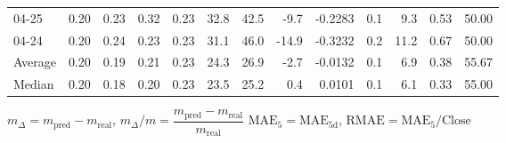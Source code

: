 \begin{threeparttable}
{\begin{tabular}{lrrrrrrrrrrrr}
  04-25 &          0.20 &          0.23 &          0.32 &        0.23 &                32.8 &                42.5 &       -9.7 &      -0.2283 &                 0.1 &              9.3 &            0.53 &                  50.00 \\
  04-24 &          0.20 &          0.24 &          0.23 &        0.23 &                31.1 &                46.0 &      -14.9 &      -0.3232 &                 0.2 &             11.2 &            0.67 &                  50.00 \\
Average &          0.20 &          0.19 &          0.21 &        0.23 &                24.3 &                26.9 &       -2.7 &      -0.0132 &                 0.1 &              6.9 &            0.38 &                  55.67 \\
 Median &          0.20 &          0.18 &          0.20 &        0.23 &                23.5 &                25.2 &        0.4 &       0.0101 &                 0.1 &              6.1 &            0.33 &                  55.00 \\
\bottomrule
\end{tabular}
}
\begin{tablenotes}\footnotesize
\item $m_\Delta=m_{\text{pred}}-m_{\text{real}}$,
$m_\Delta/m=\dfrac{m_{\text{pred}}-m_{\text{real}}}{m_{\text{real}}}$
$\mathrm{MAE}_5=\mathrm{MAE}_{5\text{d}}$,
$\mathrm{RMAE}=\mathrm{MAE}_5/\text{Close}$
\end{tablenotes}
\end{threeparttable}
\endgroup

